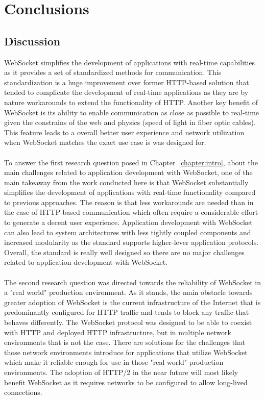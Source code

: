 \chapter{Conclusions}
\label{chapter:conslusions}

\section{Discussion}

WebSocket simplifies the development of applications with real-time capabilities as it provides a set of standardized methods for communication. This standardization is a huge improvement over former HTTP-based solution that tended to complicate the development of real-time applications as they are by nature workarounds to extend the functionality of HTTP. Another key benefit of WebSocket is its ability to enable communication as close as possible to real-time given the constrains of the web and physics (speed of light in fiber optic cables). This feature leads to a overall better user experience and network utilization when WebSocket matches the exact use case is was designed for.
\\ \\
To answer the first research question posed in Chapter~\ref{chapter:intro}, about the main challenges related to application development with WebSocket, one of the main takeaway from the work conducted here is that WebSocket substantially simplifies the development of applications with real-time functionality compared to previous approaches. The reason is that less workarounds are needed than in the case of HTTP-based communication which often require a considerable effort to generate a decent user experience. Application development with WebSocket can also lead to system architectures with less tightly coupled components and increased modularity as the standard supports higher-lever application protocols. Overall, the standard is really well designed so there are no major challenges related to application development with WebSocket.
\\ \\
The second research question was directed towards the reliability of WebSocket in a "real world" production environment. As it stands, the main obstacle towards greater adoption of WebSocket is the current infrastructure of the Internet that is predominantly configured for HTTP traffic and tends to block any traffic that behaves differently. The WebSocket protocol was designed to be able to coexist with HTTP and deployed HTTP infrastructure, but in multiple network environments that is not the case. There are solutions for the challenges that those network environments introduce for applications that utilize WebSocket which make it reliable enough for use in those "real world" production environments. The adoption of HTTP/2 in the near future will most likely benefit WebSocket as it requires networks to be configured to allow long-lived connections.
